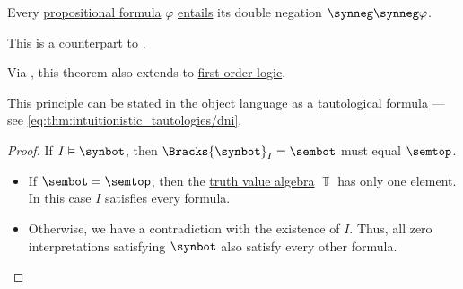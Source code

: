 \begin{theorem}\label{thm:propositional_semantic_dni}
  Every \hyperref[def:propositional_formula]{propositional formula} \( \varphi \) \hyperref[def:propositional_semantics/entailment]{entails} its double negation \( \synneg \synneg \varphi \).
\end{theorem}
\begin{comments}
  \item This is a counterpart to .

  \item Via , this theorem also extends to \hyperref[def:first_order_logic]{first-order logic}.

  \item This principle can be stated in the object language as a \hyperref[def:tautology]{tautological formula} --- see \eqref{eq:thm:intuitionistic_tautologies/dni}.
\end{comments}
\begin{proof}
  If \( I \vDash \synbot \), then \( \Bracks{\synbot}_I = \sembot \) must equal \( \semtop \).

  \begin{itemize}
    \item If \( \sembot = \semtop \), then the \hyperref[def:truth_value_algebra]{truth value algebra} \( \BbbT \) has only one element. In this case \( I \) satisfies every formula.

    \item Otherwise, we have a contradiction with the existence of \( I \). Thus, all zero interpretations satisfying \( \synbot \) also satisfy every other formula.
  \end{itemize}
\end{proof}

